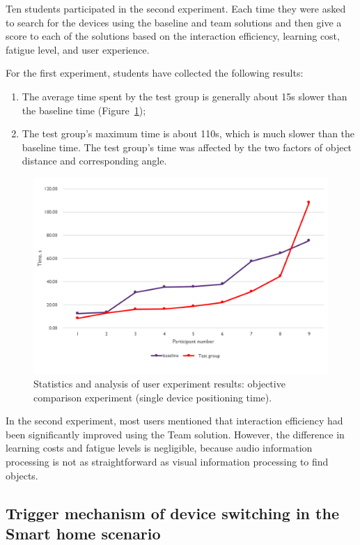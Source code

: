 Ten students participated in the second experiment. Each time they were asked to search for the devices using the baseline and team solutions and then give a score to each of the solutions based on the interaction efficiency, learning cost, fatigue level, and user experience. 

For the first experiment, students have collected the following results:
\begin{enumerate}
    \item The average time spent by the test group is generally about 15s slower than the baseline time (Figure~\ref{fig:Project1-figure});
    \item The test group's maximum time is about 110s, which is much slower than the baseline time. The test group's time was affected by the two factors of object distance and corresponding angle.
\end{enumerate}

\begin{figure}
  \centering
  \includegraphics[width=0.9\linewidth]{figures/Project_1.png}
  \caption{Statistics and analysis of user experiment results: objective comparison experiment (single device positioning time).}
  \label{fig:Project1-figure}
\end{figure}

In the second experiment, most users mentioned that interaction efficiency had been significantly improved using the Team solution. However, the difference in learning costs and fatigue levels is negligible, because audio information processing is not as straightforward as visual information processing to find objects. 

\subsection{Trigger mechanism of device switching in the Smart home scenario}

